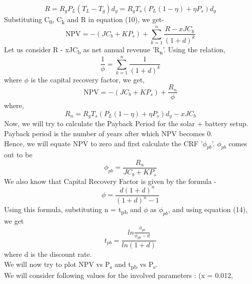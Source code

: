 \documentclass{article}
\begin{document}
\begin{equation}
	R = R_g P_L (T_L - T_g) d_y = R_g  T_s (P_L (1 - \eta) + \eta P_s) d_y
\end{equation}
\newline
Substituting C\textsubscript{0}, C\textsubscript{k} and R in equation (10), we get-\\
\[
  \text{NPV} = -(J C_b + K P_s) + \sum_{k=1}^{n} \frac{R - x J C_b}{(1+d)^k}
\]
Let us consider R - xJC\textsubscript{b} as net annual revenue 'R\textsubscript{n}'. Using the relation,
\[
  \frac{1}{\phi} = \sum_{k=1}^{n} \frac{1}{(1+d)^k}
\] 
where \(\phi\) is the capital recovery factor, we get,
\begin{equation}
	\text{NPV} = -(J C_b + K P_s) + \frac{R_n}{\phi}
\end{equation}
where,
\begin{equation}
  R_n = R_g  T_s (P_L (1 - \eta) + \eta P_s) d_y - x J C_b
\end{equation}
\newline
\newline
\newline
Now, we will try to calculate the Payback Period for the solar + battery setup.\\
Payback period is the number of years after which NPV becomes 0.\\
\newline
Hence, we will equate NPV to zero and first calculate the CRF '\(\phi_{pb}\)'. \(\phi_{pb}\) comes out to be \\
\begin{equation}
  \phi_{pb} = \frac{R_n}{J C_b + K P_s}
\end{equation}
\newline
We also know that Capital Recovery Factor is given by the formula -\\
\[
  \phi = \frac {d (1+d)^n}{(1+d)^n - 1} 
\]
Using this formula, substituting n = t\textsubscript{pb} and \(\phi\) as \(\phi_{pb}\), and using equation (14), we get\\
\begin{equation}
	t_{pb} = \frac{ln \frac{\phi_{pb}}{\phi_{pb} - d}}{ln (1+d)}
\end{equation} 
where d is the discount rate.\\
\newline
We will now try to plot NPV vs P\textsubscript{s} and t\textsubscript{pb} vs P\textsubscript{s}.\\
We will consider following values for the involved parameters :
(x = 0.012,
\end{document}
